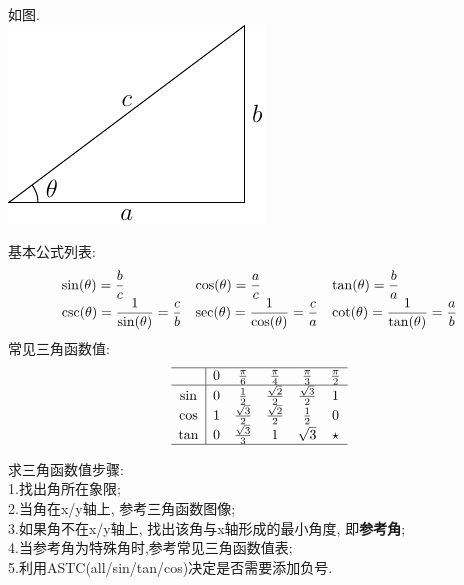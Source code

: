 \documentclass[UTF8, fontset=ubuntu]{ctexart}
\begin{document}
如图.\\
\includegraphics{triangel.pdf}

基本公式列表:\\
\begin{displaymath}
\begin{array}{l l l}
    \displaystyle\sin(\theta)=\frac{b}{c} & \displaystyle\cos(\theta)=\frac{a}{c} & \displaystyle\tan(\theta)=\frac{b}{a}\\
    \displaystyle\csc(\theta)=\frac{1}{\sin(\theta)}=\frac{c}{b} & \displaystyle\sec(\theta)=\frac{1}{\cos(\theta)}=\frac{c}{a} & \displaystyle\cot(\theta)=\frac{1}{\tan(\theta)}=\frac{a}{b}
\end{array}
\end{displaymath}
常见三角函数值:
\begin{displaymath}
\begin{array}{c|c c c c c}
\hline
    & 0 & \frac{\pi}{6} & \frac{\pi}{4} & \frac{\pi}{3} & \frac{\pi}{2}\\
\hline
    \sin & 0 & \frac{1}{2} & \frac{\sqrt{2}}{2} & \frac{\sqrt{3}}{2} & 1\\
    \cos & 1 & \frac{\sqrt{3}}{2} & \frac{\sqrt{2}}{2} & \frac{1}{2} & 0\\
    \tan & 0 & \frac{\sqrt{3}}{3} & 1 & \sqrt{3} & \star\\
\hline
\end{array}
\end{displaymath}

求三角函数值步骤:\\
1.找出角所在象限;\\
2.当角在x/y轴上, 参考三角函数图像;\\
3.如果角不在x/y轴上, 找出该角与x轴形成的最小角度, 即\textbf{参考角};\\
4.当参考角为特殊角时,参考常见三角函数值表;\\
5.利用ASTC(all/sin/tan/cos)决定是否需要添加负号.
\end{document}
